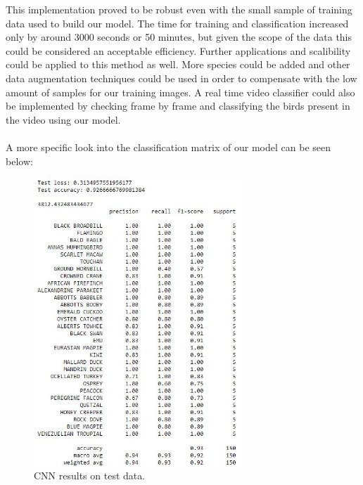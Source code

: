 \documentclass[11pt]{article}
\begin{document}
\begin{singlespace}
This implementation proved to be robust even with the small sample of training data used to build our model. The time for training and classification increased only by around 3000 seconds or 50 minutes, but given the scope of the data this could be considered an acceptable efficiency. Further applications and scalibility could be applied to this method as well. More species could be added and other data augmentation techniques could be used in order to compensate with the low amount of samples for our training images. A real time video classifier could also be implemented by checking frame by frame and classifying the birds present in the video using our model. \\ \\

A more specific look into the classification matrix of our model can be seen below:

\begin{figure}[p]
    \centering
    \includegraphics[width=0.7\textwidth]{plots/CNN-results_final.jpg}
    \caption{CNN results on test data.}
\end{figure}



\end{singlespace}
\end{document}
